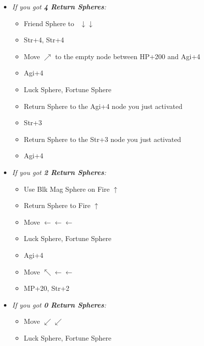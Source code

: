 \begin{spheregrid}
    \begin{itemize}
        \yunaf
        \begin{itemize}
            \item \textit{If you got \textbf{4 Return Spheres}:}
            \begin{itemize}
                \item Friend Sphere to \lulu\ $\downarrow\downarrow$
                \item Str+4, Str+4
                \item Move $\nearrow$ to the empty node between HP+200 and Agi+4
                \item Agi+4
                \item Luck Sphere, Fortune Sphere
                \item Return Sphere to the Agi+4 node you just activated
                \item Str+3
                \item Return Sphere to the Str+3 node you just activated
                \item Agi+4
            \end{itemize}
            \item \textit{If you got \textbf{2 Return Spheres}:}
            \begin{itemize}
                \item Use Blk Mag Sphere on Fire $\uparrow$
                \item Return Sphere to Fire $\uparrow$
                \item Move $\leftarrow\leftarrow\leftarrow$
                \item Luck Sphere, Fortune Sphere
                \item Agi+4
                \item Move $\nwarrow\leftarrow\leftarrow$
                \item MP+20, Str+2
            \end{itemize}
            \item \textit{If you got \textbf{0 Return Spheres}:}
            \begin{itemize}
                \item Move $\swarrow\swarrow$
                \item Luck Sphere, Fortune Sphere
            \end{itemize}
        \end{itemize}
    \end{itemize}
\end{spheregrid}
